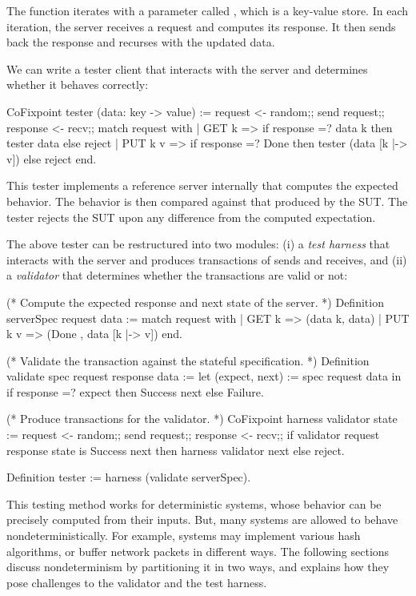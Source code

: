 The  function iterates with a parameter called , which is
a key-value store.  In each iteration, the server receives a request and
computes its response.  It then sends back the response and recurses with the
updated data.

We can write a tester client that interacts with the server and determines
whether it behaves correctly:
\begin{coq}
  CoFixpoint tester (data: key -> value) :=
    request <- random;;
    send request;;
    response <- recv;;
    match request with
    | GET k   => if response =? data k
                 then tester data
                 else reject
    | PUT k v => if response =? Done
                 then tester (data [k |-> v])
                 else reject
    end.
\end{coq}
This tester implements a reference server internally that computes the expected
behavior.  The behavior is then compared against that produced by the SUT.  The
tester rejects the SUT upon any difference from the computed expectation.

The above tester can be restructured into two modules: (i) a {\em test harness}
that interacts with the server and produces transactions of sends and receives,
and (ii) a {\em validator} that determines whether the transactions are valid or
not:
\begin{coq}
  (* Compute the expected response and next state of the server. *)
  Definition serverSpec request data :=
    match request with
    | GET k   => (data k, data)
    | PUT k v => (Done  , data [k |-> v])
    end.

  (* Validate the transaction against the stateful specification. *)
  Definition validate spec request response data :=
    let (expect, next) := spec request data in
    if response =? expect then Success next else Failure.

  (* Produce transactions for the validator. *)
  CoFixpoint harness validator state :=
    request <- random;;
    send request;;
    response <- recv;;
    if validator request response state is Success next
    then harness validator next
    else reject.

  Definition tester := harness (validate serverSpec).
\end{coq}
This testing method works for deterministic systems, whose behavior can be
precisely computed from their inputs.  But, many systems are allowed to behave
nondeterministically.  For example, systems may implement various hash
algorithms, or buffer network packets in different ways.  The following sections
discuss nondeterminism by partitioning it in two ways, and explains how they
pose challenges to the validator and the test harness.

